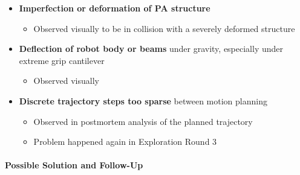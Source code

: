 \begin{itemize}
    \item \textbf{Imperfection or deformation of PA structure}
    \begin{itemize}
        \item Observed visually to be in collision with a severely deformed structure
    \end{itemize}
    \item \textbf{Deflection of robot body or beams} under gravity, especially under extreme grip cantilever
    \begin{itemize}
        \item Observed visually
    \end{itemize}
    \item \textbf{Discrete trajectory steps too sparse} between motion planning
    \begin{itemize}
        \item Observed in postmortem analysis of the planned trajectory
        \item Problem happened again in Exploration Round 3 
    \end{itemize}
\end{itemize}


\paragraph{Possible Solution and Follow-Up}

